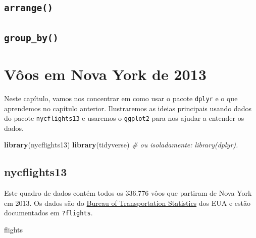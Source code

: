 \documentclass[]{book}
\newenvironment{Shaded}{\begin{snugshade}}{\end{snugshade}}
\newcommand{\CommentTok}[1]{\textcolor[rgb]{0.56,0.35,0.01}{\textit{#1}}}
\newcommand{\KeywordTok}[1]{\textcolor[rgb]{0.13,0.29,0.53}{\textbf{#1}}}
\newcommand{\NormalTok}[1]{#1}
\begin{document}
\hypertarget{arrange}{%
\section{\texorpdfstring{\texttt{arrange()}}{arrange()}}\label{arrange}}

\hypertarget{group_by}{%
\section{\texorpdfstring{\texttt{group\_by()}}{group\_by()}}\label{group_by}}

\hypertarget{application}{%
\chapter{Vôos em Nova York de 2013}\label{application}}

Neste capítulo, vamos nos concentrar em como usar o pacote \texttt{dplyr} e o que aprendemos no capítulo anterior. Ilustraremos as ideias principais usando dados do pacote \texttt{nycflights13} e usaremos o \texttt{ggplot2} para nos ajudar a entender os dados.

\begin{Shaded}
\begin{Highlighting}[]
\KeywordTok{library}\NormalTok{(nycflights13)}
\KeywordTok{library}\NormalTok{(tidyverse) }\CommentTok{# ou isoladamente: library(dplyr).}
\end{Highlighting}
\end{Shaded}

\hypertarget{nycflights13}{%
\section{nycflights13}\label{nycflights13}}

Este quadro de dados contém todos os 336.776 vôos que partiram de Nova York em 2013. Os dados são do \href{https://www.transtats.bts.gov/DatabaseInfo.asp?DB_ID=120\&Link=0}{Bureau of Transportation Statistics} dos EUA e estão documentados em \texttt{?flights}.

\begin{Shaded}
\begin{Highlighting}[]
\NormalTok{flights}
\end{Highlighting}
\end{Shaded}
\end{document}
